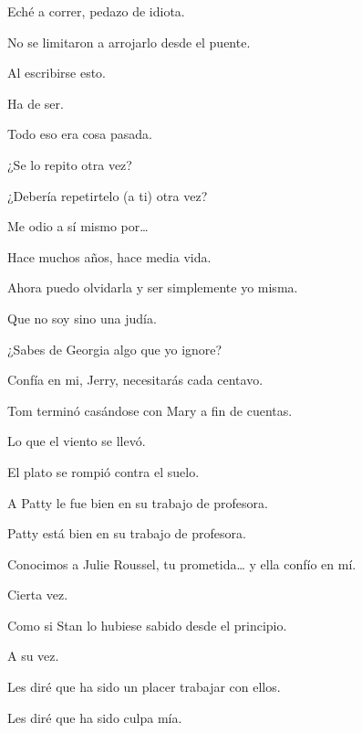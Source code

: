 \sk
Eché a correr, pedazo de idiota.\nb{}

\sk
No se limitaron a arrojarlo desde el puente.\nb{}

\sk
Al escribirse esto. 

\sk
Ha de ser. 

\sk
Todo eso era cosa pasada. 

\sk
¿Se lo repito otra vez? 

\sk
¿Debería repetirtelo (a ti) otra vez?\nb{}

\sk
Me odio a sí mismo por\ldots{} 

\sk
Hace muchos años, hace media vida. 

\sk
Ahora puedo olvidarla y ser simplemente yo misma.\nb{}

\sk
Que no soy sino una judía. 

\sk
¿Sabes de Georgia algo que yo ignore? 

\sk
Confía en mi, Jerry, necesitarás cada centavo. 

\sk
Tom terminó casándose con Mary a fin de cuentas. 

\sk
Lo que el viento se llevó. 

\sk
El plato se rompió contra el suelo. \nb{}

\sk
A Patty le fue bien en su trabajo de profesora. 

\sk
Patty está bien en su trabajo de profesora. 

\sk
Conocimos a Julie Roussel, tu prometida\ldots{} y ella confío en mí. 

\sk
Cierta vez. 

\sk
Como si Stan lo hubiese sabido desde el principio. 

\sk
A su vez. 

\sk
Les diré que ha sido un placer trabajar con ellos. 

\sk
Les diré que ha sido culpa mía. 

